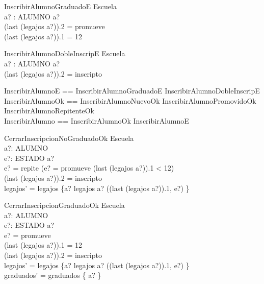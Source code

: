 \documentclass{article}
\begin{document}
  \begin{schema}{InscribirAlumnoGraduadoE}
    \Xi Escuela \\
    a? : ALUMNO
    \where
    a? \in {} \\
    (last \; (legajos \; a?)).2 = promueve \\
    (last \; (legajos \; a?)).1 = 12
  \end{schema}

  \begin{schema}{InscribirAlumnoDobleInscripE}
    \Xi Escuela \\
    a? : ALUMNO
    \where
    a? \in {} \\
    (last \; (legajos \; a?)).2 = inscripto
  \end{schema}

  \begin{zed}
    InscribirAlumnoE == InscribirAlumnoGraduadoE \lor InscribirAlumnoDobleInscripE \\
    InscribirAlumnoOk == InscribirAlumnoNuevoOk \lor InscribirAlumnoPromovidoOk \\ 
                         \lor InscribirAlumnoRepitenteOk \\
    InscribirAlumno == InscribirAlumnoOk \lor InscribirAlumnoE
  \end{zed}

  \begin{schema}{CerrarInscripcionNoGraduadoOk}
    \Delta Escuela \\
    a?: ALUMNO \\
    e?: ESTADO
    \where
    a? \in {} \\
    e? = repite \lor (e? = promueve \land (last \; (legajos \; a?)).1 < 12) \\
    (last \; (legajos \; a?)).2 = inscripto \\
    legajos' = legajos \oplus \{a? \mapsto legajos \; a? \cat \langle ((last \; (legajos \; a?)).1, e?) \rangle\}
  \end{schema}

  \begin{schema}{CerrarInscripcionGraduadoOk}
    \Delta Escuela \\
    a?: ALUMNO \\
    e?: ESTADO
    \where
    a? \in {} \\
    e? = promueve \\
    (last \; (legajos \; a?)).1 = 12 \\
    (last \; (legajos \; a?)).2 = inscripto \\
    legajos' = legajos \oplus \{a? \mapsto legajos \; a? \cat \langle ((last \; (legajos \; a?)).1, e?) \rangle\} \\
    graduados' = graduados \cup \{ a? \}
  \end{schema}
\end{document}
